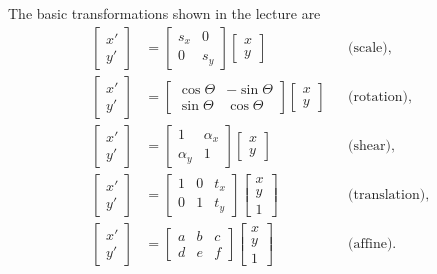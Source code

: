\documentclass[11pt,a4paper,oneside]{report}
\begin{document}
The basic transformations shown in the lecture are
\begin{align}
\begin{bmatrix}x'\\y'\end{bmatrix}
&=\begin{bmatrix}s_x&0\\0&s_y\end{bmatrix}
\begin{bmatrix}x\\y\end{bmatrix} &&\text{(scale)},\label{eq:align-scale}\\
\begin{bmatrix}x'\\y'\end{bmatrix}
&=\begin{bmatrix}\cos\Theta&-\sin\Theta\\\sin\Theta&\cos\Theta\end{bmatrix}
\begin{bmatrix}x\\y\end{bmatrix} &&\text{(rotation)},\label{eq:align-rotation}\\
\begin{bmatrix}x'\\y'\end{bmatrix}
&=\begin{bmatrix}1&\alpha_x\\\alpha_y&1\end{bmatrix}
\begin{bmatrix}x\\y\end{bmatrix} &&\text{(shear)},\label{eq:align-shear}\\
\begin{bmatrix}x'\\y'\end{bmatrix}
&=\begin{bmatrix}1&0&t_x\\0&1&t_y\end{bmatrix}
\begin{bmatrix}x\\y\\1\end{bmatrix} &&\text{(translation)},\label{eq:align-translation}\\
\begin{bmatrix}x'\\y'\end{bmatrix}
&=\begin{bmatrix}a&b&c\\d&e&f\end{bmatrix}
\begin{bmatrix}x\\y\\1\end{bmatrix} &&\text{(affine)}.\label{eq:align-affine}
\end{align}
\end{document}
